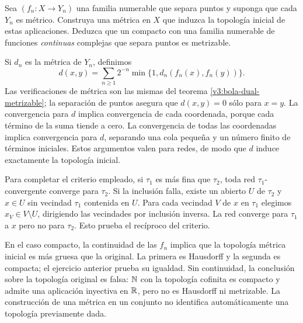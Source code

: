 \begin{ejercicio}\label{ej:v3-l16-2}
Sea $(f_n:X\to Y_n)$ una familia numerable que separa puntos y suponga que cada $Y_n$ es métrico. Construya una métrica en $X$ que induzca la topología inicial de estas aplicaciones. Deduzca que un compacto con una familia numerable de funciones \emph{continuas} complejas que separa puntos es metrizable.
\end{ejercicio}
\begin{solucion}
Si $d_n$ es la métrica de $Y_n$, definimos
\[
 d(x,y)=\sum_{n\geq1}2^{-n}\min\{1,d_n(f_n(x),f_n(y))\}.
\]
Las verificaciones de métrica son las mismas del teorema \ref{v3:bola-dual-metrizable}; la separación de puntos asegura que $d(x,y)=0$ sólo para $x=y$. La convergencia para $d$ implica convergencia de cada coordenada, porque cada término de la suma tiende a cero. La convergencia de todas las coordenadas implica convergencia para $d$, separando una cola pequeña y un número finito de términos iniciales. Estos argumentos valen para redes, de modo que $d$ induce exactamente la topología inicial.

Para completar el criterio empleado, si $\tau_1$ es más fina que $\tau_2$, toda red $\tau_1$-convergente converge para $\tau_2$. Si la inclusión falla, existe un abierto $U$ de $\tau_2$ y $x\in U$ sin vecindad $\tau_1$ contenida en $U$. Para cada vecindad $V$ de $x$ en $\tau_1$ elegimos $x_V\in V\setminus U$, dirigiendo las vecindades por inclusión inversa. La red converge para $\tau_1$ a $x$ pero no para $\tau_2$. Esto prueba el recíproco del criterio.

En el caso compacto, la continuidad de las $f_n$ implica que la topología métrica inicial es más gruesa que la original. La primera es Hausdorff y la segunda es compacta; el ejercicio anterior prueba su igualdad. Sin continuidad, la conclusión sobre la topología original es falsa: $\mathbb N$ con la topología cofinita es compacto y admite una aplicación inyectiva en $\mathbb R$, pero no es Hausdorff ni metrizable. La construcción de una métrica en un conjunto no identifica automáticamente una topología previamente dada.
\end{solucion}

